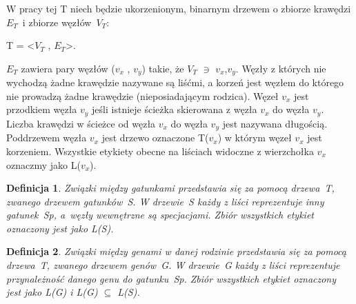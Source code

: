 \documentclass[licencjacka]{pracamgr}
\newtheorem{defi}{Definicja}[section]
\begin{document}
W pracy tej T niech będzie ukorzenionym, binarnym drzewem o zbiorze krawędzi $E_T$~i zbiorze węzłów~$V_T$:
\begin{center}
T = <$V_T$ , $E_T$>.
\end{center}
$E_T$ zawiera pary węzłów ($v_x$ , $v_y$) takie, że $V_T$ $\ni$ $v_x$,$v_y$. Węzły z których nie wychodzą żadne krawędzie nazywane są liśćmi, a korzeń jest węzłem do którego nie prowadzą żadne krawędzie (nieposiadającym rodzica). Węzeł $v_x$ jest przodkiem węzła $v_y$ jeśli istnieje ścieżka skierowana z węzła $v_x$ do węzła $v_y$. Liczba krawędzi w ścieżce od węzła $v_x$ do węzła $v_y$ jest nazywana długością. Poddrzewem węzła $v_x$ jest drzewo oznaczone T($v_x$) w którym węzeł $v_x$ jest korzeniem. Wszystkie etykiety obecne na liściach widoczne z wierzchołka $v_x$ oznaczmy jako L($v_x$).


\begin{defi}\label{Drzewa gatunków}
  Związki między gatunkami przedstawia się za pomocą drzewa~T, zwanego drzewem gatunków~S. W drzewie~S każdy z liści reprezentuje inny gatunek~Sp, a~węzły wewnętrzne są specjacjami. Zbiór wszystkich etykiet oznaczony jest jako L(S).
\end{defi}

\begin{defi}\label{Drzewa genów}
  Związki między genami w danej rodzinie przedstawia się za pomocą drzewa~T, zwanego drzewem genów~G. W drzewie~G każdy z liści reprezentuje przynależność danego genu do gatunku~Sp. Zbiór wszystkich etykiet oznaczony jest jako L(G) i L(G) $\subseteq$ L(S).
\end{defi}
\end{document}
